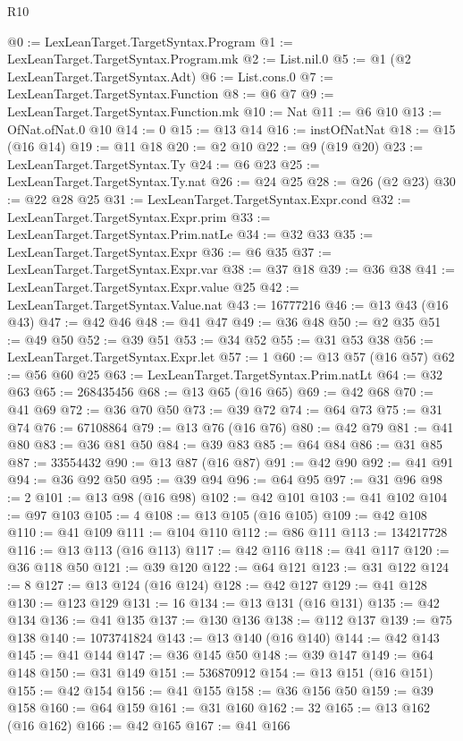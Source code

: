 \begin{lexlean}{R10}
\begin{coremodule}
@0 := LexLeanTarget.TargetSyntax.Program
@1 := LexLeanTarget.TargetSyntax.Program.mk
@2 := List.nil.{0}
@5 := @1 (@2 LexLeanTarget.TargetSyntax.Adt)
@6 := List.cons.{0}
@7 := LexLeanTarget.TargetSyntax.Function
@8 := @6 @7
@9 := LexLeanTarget.TargetSyntax.Function.mk
@10 := Nat
@11 := @6 @10
@13 := OfNat.ofNat.{0} @10
@14 := 0
@15 := @13 @14
@16 := instOfNatNat
@18 := @15 (@16 @14)
@19 := @11 @18
@20 := @2 @10
@22 := @9 (@19 @20)
@23 := LexLeanTarget.TargetSyntax.Ty
@24 := @6 @23
@25 := LexLeanTarget.TargetSyntax.Ty.nat
@26 := @24 @25
@28 := @26 (@2 @23)
@30 := @22 @28 @25
@31 := LexLeanTarget.TargetSyntax.Expr.cond
@32 := LexLeanTarget.TargetSyntax.Expr.prim
@33 := LexLeanTarget.TargetSyntax.Prim.natLe
@34 := @32 @33
@35 := LexLeanTarget.TargetSyntax.Expr
@36 := @6 @35
@37 := LexLeanTarget.TargetSyntax.Expr.var
@38 := @37 @18
@39 := @36 @38
@41 := LexLeanTarget.TargetSyntax.Expr.value @25
@42 := LexLeanTarget.TargetSyntax.Value.nat
@43 := 16777216
@46 := @13 @43 (@16 @43)
@47 := @42 @46
@48 := @41 @47
@49 := @36 @48
@50 := @2 @35
@51 := @49 @50
@52 := @39 @51
@53 := @34 @52
@55 := @31 @53 @38
@56 := LexLeanTarget.TargetSyntax.Expr.let
@57 := 1
@60 := @13 @57 (@16 @57)
@62 := @56 @60 @25
@63 := LexLeanTarget.TargetSyntax.Prim.natLt
@64 := @32 @63
@65 := 268435456
@68 := @13 @65 (@16 @65)
@69 := @42 @68
@70 := @41 @69
@72 := @36 @70 @50
@73 := @39 @72
@74 := @64 @73
@75 := @31 @74
@76 := 67108864
@79 := @13 @76 (@16 @76)
@80 := @42 @79
@81 := @41 @80
@83 := @36 @81 @50
@84 := @39 @83
@85 := @64 @84
@86 := @31 @85
@87 := 33554432
@90 := @13 @87 (@16 @87)
@91 := @42 @90
@92 := @41 @91
@94 := @36 @92 @50
@95 := @39 @94
@96 := @64 @95
@97 := @31 @96
@98 := 2
@101 := @13 @98 (@16 @98)
@102 := @42 @101
@103 := @41 @102
@104 := @97 @103
@105 := 4
@108 := @13 @105 (@16 @105)
@109 := @42 @108
@110 := @41 @109
@111 := @104 @110
@112 := @86 @111
@113 := 134217728
@116 := @13 @113 (@16 @113)
@117 := @42 @116
@118 := @41 @117
@120 := @36 @118 @50
@121 := @39 @120
@122 := @64 @121
@123 := @31 @122
@124 := 8
@127 := @13 @124 (@16 @124)
@128 := @42 @127
@129 := @41 @128
@130 := @123 @129
@131 := 16
@134 := @13 @131 (@16 @131)
@135 := @42 @134
@136 := @41 @135
@137 := @130 @136
@138 := @112 @137
@139 := @75 @138
@140 := 1073741824
@143 := @13 @140 (@16 @140)
@144 := @42 @143
@145 := @41 @144
@147 := @36 @145 @50
@148 := @39 @147
@149 := @64 @148
@150 := @31 @149
@151 := 536870912
@154 := @13 @151 (@16 @151)
@155 := @42 @154
@156 := @41 @155
@158 := @36 @156 @50
@159 := @39 @158
@160 := @64 @159
@161 := @31 @160
@162 := 32
@165 := @13 @162 (@16 @162)
@166 := @42 @165
@167 := @41 @166

\end{coremodule}
\end{lexlean}
